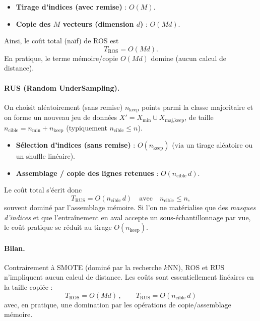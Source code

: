 \documentclass{article}
\begin{document}
\begin{itemize}
  \item \textbf{Tirage d'indices (avec remise)} : $O(M)$.
  \item \textbf{Copie des $M$ vecteurs (dimension $d$)} : $O(Md)$.
\end{itemize}

Ainsi, le coût total (naïf) de ROS est
\[
T_{\mathrm{ROS}} = O(Md).
\]
En pratique, le terme mémoire/copie $O(Md)$ domine (aucun calcul de distance).

\paragraph{RUS (Random UnderSampling).}
On choisit aléatoirement (sans remise) $n_{\text{keep}}$ points parmi la classe majoritaire
et on forme un nouveau jeu de données $X' = X_{\min} \cup X_{\text{maj},\text{keep}}$, de taille
$n_{\text{cible}} = n_{\min} + n_{\text{keep}}$ (typiquement $n_{\text{cible}} \le n$).

\begin{itemize}
  \item \textbf{Sélection d'indices (sans remise)} : $O(n_{\text{keep}})$
  (via un tirage aléatoire ou un shuffle linéaire).
  \item \textbf{Assemblage / copie des lignes retenues} : $O(n_{\text{cible}}\, d)$.
\end{itemize}

Le coût total s'écrit donc
\[
T_{\mathrm{RUS}} = O(n_{\text{cible}}\, d) \quad\text{avec}\quad n_{\text{cible}} \le n,
\]
souvent dominé par l'assemblage mémoire. Si l'on ne matérialise que des \emph{masques d'indices}
et que l'entraînement en aval accepte un sous-échantillonnage par vue, le coût pratique se réduit
au tirage $O(n_{\text{keep}})$.

\paragraph{Bilan.}
Contrairement à SMOTE (dominé par la recherche $k$NN), ROS et RUS n'impliquent aucun calcul de distance.
Les coûts sont essentiellement linéaires en la taille copiée :
\[
\boxed{\,T_{\mathrm{ROS}} = O(Md)\,,\qquad T_{\mathrm{RUS}} = O(n_{\text{cible}}\, d)\,}
\]
avec, en pratique, une domination par les opérations de copie/assemblage mémoire.

\newpage

\printbibliography
\end{document}
